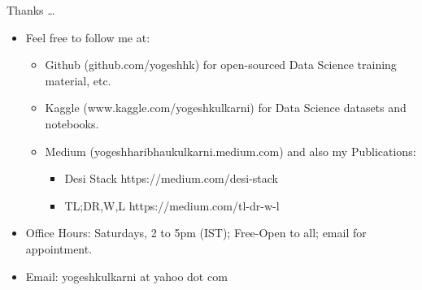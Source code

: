 \begin{frame}[c]{}

Thanks \ldots

\begin{itemize}
\item Feel free to follow me at:
      \begin{itemize}
			\item Github (github.com/yogeshhk) for open-sourced Data Science training material, etc.
			\item Kaggle (www.kaggle.com/yogeshkulkarni) for Data Science datasets and notebooks.
			\item Medium (yogeshharibhaukulkarni.medium.com) and also my Publications:
				\begin{itemize}
				\item Desi Stack https://medium.com/desi-stack
				\item TL;DR,W,L https://medium.com/tl-dr-w-l
				\end{itemize}
			\end{itemize}
\item Office Hours: Saturdays, 2 to 5pm (IST); Free-Open to all; email for appointment.
\item Email: yogeshkulkarni at yahoo dot com
\end{itemize}
\end{frame}